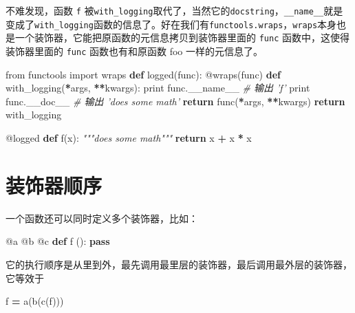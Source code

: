 \documentclass[]{ctexbook}
\newenvironment{Shaded}{\begin{snugshade}}{\end{snugshade}}
\newcommand{\AttributeTok}[1]{\textcolor[rgb]{0.77,0.63,0.00}{#1}}
\newcommand{\BuiltInTok}[1]{#1}
\newcommand{\CommentTok}[1]{\textcolor[rgb]{0.56,0.35,0.01}{\textit{#1}}}
\newcommand{\ControlFlowTok}[1]{\textcolor[rgb]{0.13,0.29,0.53}{\textbf{#1}}}
\newcommand{\ImportTok}[1]{#1}
\newcommand{\KeywordTok}[1]{\textcolor[rgb]{0.13,0.29,0.53}{\textbf{#1}}}
\newcommand{\NormalTok}[1]{#1}
\newcommand{\OperatorTok}[1]{\textcolor[rgb]{0.81,0.36,0.00}{\textbf{#1}}}
\newcommand{\VariableTok}[1]{\textcolor[rgb]{0.00,0.00,0.00}{#1}}
\begin{document}
不难发现，函数 \texttt{f} 被\texttt{with\_logging}取代了，当然它的\texttt{docstring}，\texttt{\_\_name\_\_}就是变成了\texttt{with\_logging}函数的信息了。好在我们有\texttt{functools.wraps}，\texttt{wraps}本身也是一个装饰器，它能把原函数的元信息拷贝到装饰器里面的 \texttt{func} 函数中，这使得装饰器里面的 \texttt{func} 函数也有和原函数 foo 一样的元信息了。

\begin{Shaded}
\begin{Highlighting}[]
\ImportTok{from}\NormalTok{ functools }\ImportTok{import}\NormalTok{ wraps}
\KeywordTok{def}\NormalTok{ logged(func):}
    \AttributeTok{@wraps}\NormalTok{(func)}
    \KeywordTok{def}\NormalTok{ with_logging(}\OperatorTok{*}\NormalTok{args, }\OperatorTok{**}\NormalTok{kwargs):}
        \BuiltInTok{print}\NormalTok{ func.}\VariableTok{__name__}      \CommentTok{# 输出 'f'}
        \BuiltInTok{print}\NormalTok{ func.__doc__       }\CommentTok{# 输出 'does some math'}
        \ControlFlowTok{return}\NormalTok{ func(}\OperatorTok{*}\NormalTok{args, }\OperatorTok{**}\NormalTok{kwargs)}
    \ControlFlowTok{return}\NormalTok{ with_logging}

\AttributeTok{@logged}
\KeywordTok{def}\NormalTok{ f(x):}
   \CommentTok{"""does some math"""}
   \ControlFlowTok{return}\NormalTok{ x }\OperatorTok{+}\NormalTok{ x }\OperatorTok{*}\NormalTok{ x}
\end{Highlighting}
\end{Shaded}

\hypertarget{ux88c5ux9970ux5668ux987aux5e8f}{%
\section{装饰器顺序}\label{ux88c5ux9970ux5668ux987aux5e8f}}

一个函数还可以同时定义多个装饰器，比如：

\begin{Shaded}
\begin{Highlighting}[]
\AttributeTok{@a}
\AttributeTok{@b}
\AttributeTok{@c}
\KeywordTok{def}\NormalTok{ f ():}
    \ControlFlowTok{pass}
\end{Highlighting}
\end{Shaded}

它的执行顺序是从里到外，最先调用最里层的装饰器，最后调用最外层的装饰器，它等效于

\begin{Shaded}
\begin{Highlighting}[]
\NormalTok{f }\OperatorTok{=}\NormalTok{ a(b(c(f)))}
\end{Highlighting}
\end{Shaded}
\end{document}
